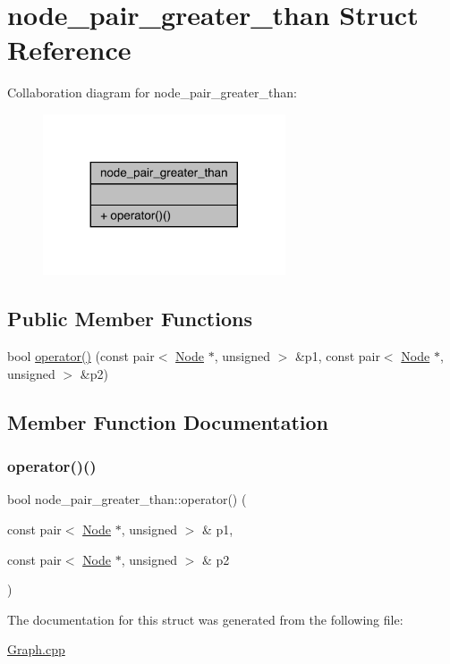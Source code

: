 \hypertarget{structnode__pair__greater__than}{}\section{node\+\_\+pair\+\_\+greater\+\_\+than Struct Reference}
\label{structnode__pair__greater__than}


Collaboration diagram for node\+\_\+pair\+\_\+greater\+\_\+than\+:\nopagebreak
\begin{figure}[H]
\begin{center}
\leavevmode
\includegraphics[width=203pt]{structnode__pair__greater__than__coll__graph}
\end{center}
\end{figure}
\subsection*{Public Member Functions}
\begin{DoxyCompactItemize}
\item 
bool \hyperlink{structnode__pair__greater__than_aefc537db2afdf9b3b89469adaaeea00b}{operator()} (const pair$<$ \hyperlink{class_node}{Node} $\ast$, unsigned $>$ \&p1, const pair$<$ \hyperlink{class_node}{Node} $\ast$, unsigned $>$ \&p2)
\end{DoxyCompactItemize}


\subsection{Member Function Documentation}
\hypertarget{structnode__pair__greater__than_aefc537db2afdf9b3b89469adaaeea00b}{}\label{structnode__pair__greater__than_aefc537db2afdf9b3b89469adaaeea00b} 
\subsubsection{\texorpdfstring{operator()()}{operator()()}}
{\footnotesize\ttfamily bool node\+\_\+pair\+\_\+greater\+\_\+than\+::operator() (\begin{DoxyParamCaption}\item[{const pair$<$ \hyperlink{class_node}{Node} $\ast$, unsigned $>$ \&}]{p1,  }\item[{const pair$<$ \hyperlink{class_node}{Node} $\ast$, unsigned $>$ \&}]{p2 }\end{DoxyParamCaption})\hspace{0.3cm}{\ttfamily [inline]}}



The documentation for this struct was generated from the following file\+:\begin{DoxyCompactItemize}
\item 
\hyperlink{_graph_8cpp}{Graph.\+cpp}\end{DoxyCompactItemize}
